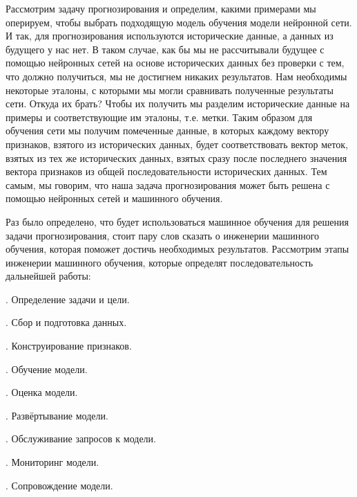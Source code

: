 {  \par \redline	Рассмотрим задачу прогнозирования и определим, какими примерами мы оперируем, чтобы выбрать подходящую модель обучения модели нейронной сети. И так, для прогнозирования используются исторические данные, а данных из будущего у нас нет. В таком случае, как бы мы не рассчитывали будущее с помощью нейронных сетей на основе исторических данных без проверки с тем, что должно получиться, мы не достигнем никаких результатов. Нам необходимы некоторые эталоны, с которыми мы могли сравнивать полученные результаты сети. Откуда их брать? Чтобы их получить мы разделим исторические данные на примеры и соответствующие им эталоны, т.е. метки. Таким образом для обучения сети мы получим помеченные данные, в которых каждому вектору признаков, взятого из исторических данных, будет соответствовать вектор меток, взятых из тех же исторических данных, взятых сразу после последнего значения вектора признаков из общей последовательности исторических данных. Тем самым, мы говорим, что наша задача прогнозирования может быть решена с помощью нейронных сетей и машинного обучения.

  \par \redline Раз было определено, что будет использоваться машинное обучения для решения задачи прогнозирования, стоит пару слов сказать о инженерии машинного обучения, которая поможет достичь необходимых результатов. Рассмотрим этапы инженерии машинного обучения, которые определят последовательность дальнейшей работы:

  \par {}. Определение задачи и цели.
  \par {}. Сбор и подготовка данных.
  \par {}. Конструирование признаков.
  \par {}. Обучение модели.
  \par {}. Оценка модели.
  \par {}. Развёртывание модели.
  \par {}. Обслуживание запросов к модели.
  \par {}. Мониторинг модели.
  \par {}. Сопровождение модели.

}
